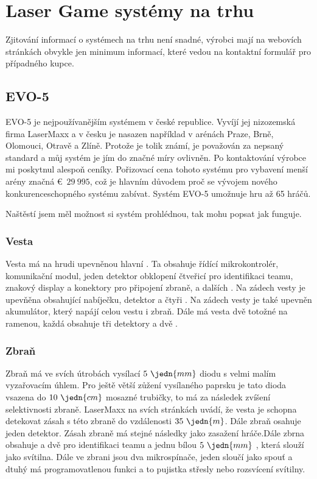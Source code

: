 \section{Laser Game systémy na trhu}
Zjitování informací o systémech na trhu není snadné, výrobci mají na webovích stránkách obvykle jen minimum informací, které vedou na kontaktní formulář pro případného kupce.

\subsection{EVO-5}

EVO-5 je nejpoužívanějším  systémem v české republice. Vyvíjí jej nizozemská firma LaserMaxx a v česku je nasazen například v arénách Praze, Brně, Olomouci, Otravě a Zlíně. Protože je tolik známí, je považován za nepsaný standard a můj systém je jím do značné míry ovlivněn. Po kontaktování výrobce mi poskytnul alespoň ceníky. Pořizovací cena tohoto systému pro vybavení menší arény značná €~$29~995$, což je hlavním důvodem proč se vývojem nového konkurenceschopného systému zabívat. Systém EVO-5 umožnuje hru až 65 hráčů.

Naštěstí jsem měl možnost si systém prohlédnou, tak mohu popsat jak funguje.

\subsubsection{Vesta}
Vesta má na hrudi upevněnou hlavní . Ta obsahuje řídící mikrokontrolér, komunikační  modul, jeden  detektor obklopení čtveřicí   pro identifikaci teamu, znakový display a konektory pro připojení zbraně, a dalších . Na zádech vesty je upevňěna  obsahující nabíječku,  detektor a čtyři  . Na zádech vesty je také upevněn akumulátor, který napájí celou vestu i zbraň. Dále má vesta dvě totožné  na ramenou, každá obsahuje tři  detektory a dvě  .

\subsubsection{Zbraň}
Zbraň má ve svích útrobách vysílací $5~\jedn{mm}$   diodu s velmi malím vyzařovacím úhlem. Pro ještě větší zůžení vysílaného paprsku je tato dioda vsazena do $10~\jedn{cm}$ mosazné trubičky, to má za následek zvíšení selektivnosti zbraně. LaserMaxx na svích stránkách uvádí, že vesta je schopna detekovat zásah s této zbraně do vzdálenosti $35~\jedn{m}$. Dále zbraň osahuje jeden  detektor. Zásah zbraně má stejné následky jako zasažení hráče.Dále zbrna obsahuje a dvě   pro identifikaci teamu a jednu bílou $5~\jedn{mm}$ , která slouží jako svítilna. Dále ve zbrani jsou dva mikrospínače, jeden sloučí jako spouť a dtuhý má programovatlenou funkci a to pujistka střesly nebo rozsvícení svítilny.

